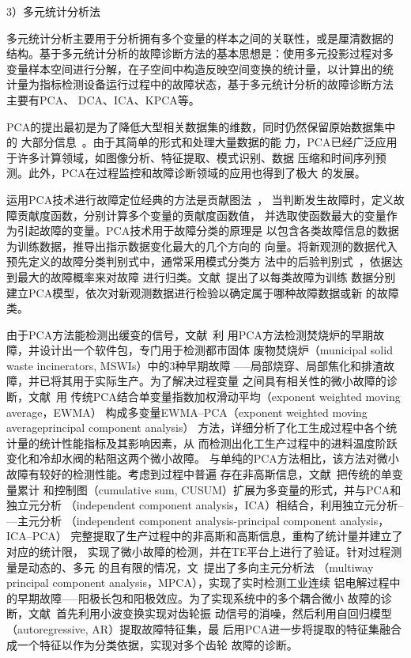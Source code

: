 3）多元统计分析法

多元统计分析主要用于分析拥有多个变量的样本之间的关联性，或是厘清数据的
结构。基于多元统计分析的故障诊断方法的基本思想是：使用多元投影过程对多
变量样本空间进行分解，在子空间中构造反映空间变换的统计量，以计算出的统
计量为指标检测设备运行过程中的故障状态，基于多元统计分析的故障诊断方法
主要有PCA、 DCA、ICA、KPCA等。

PCA的提出最初是为了降低大型相关数据集的维数，同时仍然保留原始数据集中的
大部分信息~\cite{abdi2010principal}。由于其简单的形式和处理大量数据的能
力，PCA已经广泛应用于许多计算领域，如图像分析、特征提取、模式识别、数据
压缩和时间序列预测。此外，PCA在过程监控和故障诊断领域的应用也得到了极大
的发展。

运用PCA技术进行故障定位经典的方法是贡献图法~\cite{miller1998contribution}，
当判断发生故障时，定义故障贡献度函数，分别计算多个变量的贡献度函数值，
并选取使函数最大的变量作为引起故障的变量。PCA技术用于故障分类的原理是
以包含各类故障信息的数据为训练数据，推导出指示数据变化最大的几个方向的
向量。将新观测的数据代入预先定义的故障分类判别式中，通常采用模式分类方
法中的后验判别式~\cite{duda2000pattern}，依据达到最大的故障概率来对故障
进行归类。文献~提出了以每类故障为训练
数据分别建立PCA模型，依次对新观测数据进行检验以确定属于哪种故障数据或新
的故障类。

由于PCA方法能检测出缓变的信号，文献~利
用PCA方法检测焚烧炉的早期故障，并设计出一个软件包，专门用于检测都市固体
废物焚烧炉（municipal solid waste incinerators, MSWIs）中的3种早期故障
–—局部烧穿、局部焦化和排渣故障，并已将其用于实际生产。为了解决过程变量
之间具有相关性的微小故障的诊断，文献~用
传统PCA结合单变量指数加权滑动平均（exponent weighted moving average，EWMA）
构成多变量EWMA–PCA（exponent weighted moving averageprincipal component analysis）
方法，详细分析了化工生成过程中各个统计量的统计性能指标及其影响因素，从
而检测出化工生产过程中的进料温度阶跃变化和冷却水阀的粘阻这两个微小故障。
与单纯的PCA方法相比，该方法对微小故障有较好的检测性能。考虑到过程中普遍
存在非高斯信息，文献~把传统的单变量累计
和控制图（cumulative sum, CUSUM）扩展为多变量的形式，并与PCA和独立元分析
（independent component analysis，ICA）相结合，利用独立元分析–—主元分析
（independent component analysis-principal component analysis，ICA–PCA）
完整提取了生产过程中的非高斯和高斯信息，重构了统计量并建立了对应的统计限，
实现了微小故障的检测，并在TE平台上进行了验证。针对过程测量是动态的、多元
的且有限的情况，文~提出了多向主元分析法
（multiway principal component analysis，MPCA），实现了实时检测工业连续
铝电解过程中的早期故障–—阳极长包和阳极效应。为了实现系统中的多个耦合微小
故障的诊断，文献~首先利用小波变换实现对齿轮振
动信号的消噪，然后利用自回归模型（autoregressive, AR）提取故障特征集，最
后用PCA进一步将提取的特征集融合成一个特征以作为分类依据，实现对多个齿轮
故障的诊断。

